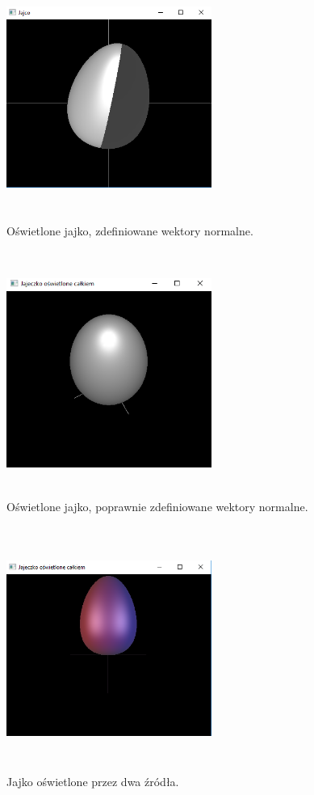 \documentclass[polish,polish,a4paper]{article}
\begin{document}
    \begin{figure}[h!]
      \centering
      \includegraphics[width=0.6\textwidth,height=8cm]{jajkopolowka.png}
      \caption{Oświetlone jajko, zdefiniowane wektory normalne.}
      \label{fig:zrzut1}
    \end{figure}

    \begin{figure}[h!]
      \centering
      \includegraphics[width=0.6\textwidth,height=8cm]{jajkocale.png}
      \caption{Oświetlone jajko, poprawnie zdefiniowane wektory normalne.}
      \label{fig:zrzut1}
    \end{figure}
    
        \begin{figure}[h!]
      \centering
      \includegraphics[width=0.6\textwidth,height=8cm]{jajkodwazrodla.png}
      \caption{Jajko oświetlone przez dwa źródła.}
      \label{fig:zrzut1}
    \end{figure}
\end{document}
